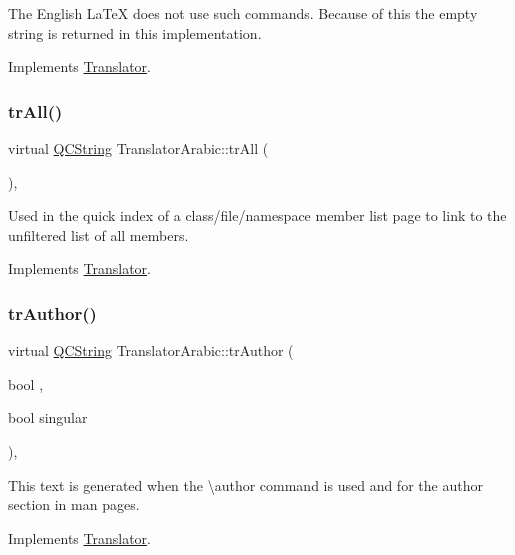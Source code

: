 The English La\+TeX does not use such commands. Because of this the empty string is returned in this implementation. 

Implements \mbox{\hyperlink{class_translator}{Translator}}.

\mbox{\label{class_translator_arabic_ab25ba70bda04768d6c1a31414567f973}} 
\subsubsection{\texorpdfstring{trAll()}{trAll()}}
{\footnotesize\ttfamily virtual \mbox{\hyperlink{class_q_c_string}{Q\+C\+String}} Translator\+Arabic\+::tr\+All (\begin{DoxyParamCaption}{ }\end{DoxyParamCaption})\hspace{0.3cm}{\ttfamily [inline]}, {\ttfamily [virtual]}}

Used in the quick index of a class/file/namespace member list page to link to the unfiltered list of all members. 

Implements \mbox{\hyperlink{class_translator}{Translator}}.

\mbox{\label{class_translator_arabic_a0250e808ef38fa180eba0595f89210ee}} 
\subsubsection{\texorpdfstring{trAuthor()}{trAuthor()}}
{\footnotesize\ttfamily virtual \mbox{\hyperlink{class_q_c_string}{Q\+C\+String}} Translator\+Arabic\+::tr\+Author (\begin{DoxyParamCaption}\item[{bool}]{,  }\item[{bool}]{singular }\end{DoxyParamCaption})\hspace{0.3cm}{\ttfamily [inline]}, {\ttfamily [virtual]}}

This text is generated when the \textbackslash{}author command is used and for the author section in man pages. 

Implements \mbox{\hyperlink{class_translator}{Translator}}.

